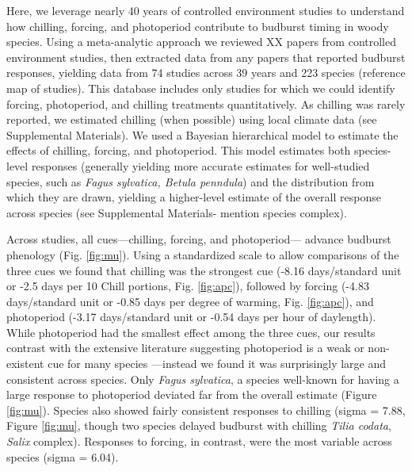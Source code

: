 \documentclass{article}
\begin{document}
\par Here, we leverage nearly 40 years of controlled environment studies to understand how chilling, forcing, and photoperiod contribute to budburst timing in woody species. Using a meta-analytic approach we reviewed XX papers from controlled environment studies, then extracted data from any papers that reported budburst responses, yielding data from 74 studies across 39 years and 223 species (reference map of studies).  This database includes only studies for which we could identify forcing, photoperiod, and chilling treatments quantitatively. As chilling was rarely reported, we estimated chilling (when possible) using local climate data (see Supplemental Materials). We used a Bayesian hierarchical model to estimate the effects of chilling, forcing, and photoperiod. This model estimates both species-level responses (generally yielding more accurate estimates for well-studied species, such as \emph{Fagus sylvatica, Betula penndula}) and the distribution from which they are drawn, yielding a higher-level estimate of the overall response across species (see Supplemental Materials- mention species complex).\\ %


\par Across studies, all cues---chilling, forcing, and photoperiod--- advance budburst phenology (Fig. \ref {fig:mu}). Using a standardized scale to allow comparisons of the three cues we found that chilling was the strongest cue (-8.16 days/standard unit or -2.5 days per 10 Chill portions, Fig. \ref {fig:apc}), followed by forcing (-4.83 days/standard unit or -0.85 days per degree of warming, Fig. \ref {fig:apc}), and photoperiod (-3.17 days/standard unit or -0.54 days per hour of daylength). While photoperiod had the smallest effect among the three cues, our results contrast with the extensive literature suggesting photoperiod is a weak or non-existent cue for many species \citep{zohner2016,koerner2010a}---instead we found it was surprisingly large and consistent across species. Only \emph{Fagus sylvatica}, a species well-known for having a large response to photoperiod deviated far from the overall estimate (Figure \ref {fig:mu}). Species also showed fairly consistent responses to chilling (sigma = 7.88, Figure \ref {fig:mu}, though two species delayed budburst with chilling \emph{Tilia codata}, \emph{Salix} complex). Responses to forcing, in contrast, were the most variable across species (sigma = 6.04).
\end{document}
